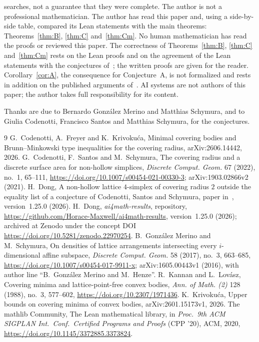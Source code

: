 \documentclass[11pt]{article}
\theoremstyle{definition}
\theoremstyle{remark}
\newcommand{\repoversion}{1.25.0}
\begin{document}
searches, not a guarantee that they were complete. The author is not a
professional mathematician. The author has read this paper and, using a side-by-side table, compared its Lean statements with the main theorems: Theorems~\ref{thm:B}, \ref{thm:C} and~\ref{thm:Cm}. No human mathematician has read the
proofs or reviewed this paper. The correctness of Theorems~\ref{thm:B},
\ref{thm:C} and~\ref{thm:Cm} rests on the Lean proofs and on the agreement of
the Lean statements with the conjectures of~\cite{gms,css}; the written proofs
are given for the reader. Corollary~\ref{cor:A}, the consequence for
Conjecture~A, is not formalized and rests in addition on the published
arguments of~\cite{css}. AI systems are not authors of this paper; the author
takes full responsibility for its content.

\medskip
\noindent Thanks are due to Bernardo González Merino and Matthias Schymura,
and to Giulia Codenotti, Francisco Santos and Matthias Schymura, for the
conjectures.

{\small
\begin{thebibliography}{9}
\setlength{\itemsep}{1pt}
 G.~Codenotti, A.~Freyer and K.~Krivokuća, Minimal covering
bodies and Brunn--Minkowski type inequalities for the covering radius,
arXiv:2606.14442, 2026.
 G.~Codenotti, F.~Santos and M.~Schymura, The covering radius and
a discrete surface area for non-hollow simplices, \emph{Discrete Comput.
Geom.} 67 (2022), no.~1, 65--111,
\url{https://doi.org/10.1007/s00454-021-00330-3}; arXiv:1903.02866v2 (2021).
 H.~Dong, A non-hollow lattice $4$-simplex of covering radius $2$
outside the equality list of a conjecture of Codenotti, Santos and Schymura,
paper in~\cite{repo}, version~\repoversion{} (2026).
 H.~Dong, \emph{ai4math-results}, repository,
\url{https://github.com/Horace-Maxwell/ai4math-results}, version~\repoversion{}
(2026); archived at Zenodo under the concept DOI
\url{https://doi.org/10.5281/zenodo.22970254}.
 B.~González Merino and M.~Schymura, On densities of lattice
arrangements intersecting every $i$-dimensional affine subspace,
\emph{Discrete Comput. Geom.} 58 (2017), no.~3, 663--685,
\url{https://doi.org/10.1007/s00454-017-9911-x}; arXiv:1605.00443v1 (2016),
with author line ``B.~González Merino and M.~Henze''.
 R.~Kannan and L.~Lovász, Covering minima and lattice-point-free
convex bodies, \emph{Ann. of Math. (2)} 128 (1988), no.~3, 577--602,
\url{https://doi.org/10.2307/1971436}.
 K.~Krivokuća, Upper bounds on covering minima of convex bodies,
arXiv:2601.15173v1, 2026.
The mathlib Community, The Lean mathematical library, in \emph{Proc.\ 9th ACM
SIGPLAN Int.\ Conf.\ Certified Programs and Proofs} (CPP '20), ACM, 2020,
\url{https://doi.org/10.1145/3372885.3373824}.
\end{thebibliography}}
\end{document}

